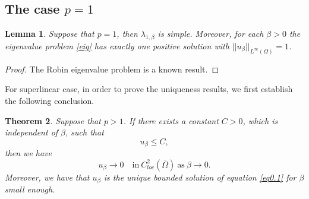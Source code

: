 \documentclass[12pt,reqno]{amsart}
\numberwithin{equation}{section}
\newtheorem{theorem}{Theorem}[section]
\newtheorem{lemma}[theorem]{Lemma}
\theoremstyle{definition}
\newtheorem{remark}{Remark}
\def\LM{\color{red}}
\begin{document}
\subsection {The case $p=1$} 

\begin{lemma}\label{lem4.2}
Suppose that $p=1$, then $\lambda_{1,\beta}$ is simple.  Moreover,   for each $\beta>0$ the eigenvalue problem \eqref{eig} has exactly one positive solution with $||u_\beta||_{L^\infty(\Omega)}=1$.
\end{lemma}

\begin{proof}
The Robin eigenvalue problem is a known result.
\end{proof}




For superlinear case, in order to prove the uniqueness results, we first establish  the following conclusion.

\begin{theorem}\label{lemma2.5}
Suppose that $p>1$. If there exists a constant $C>0$, which is independent of $\beta$, such that 
\begin{equation}\label{l2.4}
u_\beta\le C,
\end{equation}
then we have 
$$
u_\beta\to 0\quad  \text{in} \ C^2_{loc}(\bar{\Omega})\  \text{as}\ \beta\to0.
$$
Moreover, we have that $u_\beta$ is the unique bounded  solution of equation \eqref{eq0.1} for $\beta$ small enough.
\end{theorem}
\end{document}
